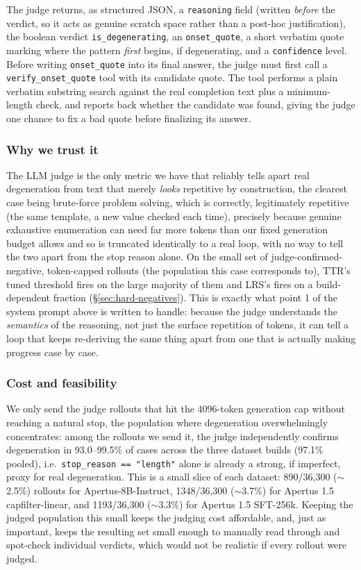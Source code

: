 \documentclass{article}
\begin{document}
The judge returns, as structured JSON, a \texttt{reasoning} field (written
\emph{before} the verdict, so it acts as genuine scratch space rather than a
post-hoc justification), the boolean verdict \texttt{is\_degenerating}, an
\texttt{onset\_quote}, a short verbatim quote marking where the pattern
\emph{first} begins, if degenerating, and a \texttt{confidence} level.
Before writing \texttt{onset\_quote} into its final answer, the judge must first call a \texttt{verify\_onset\_quote}
tool with its candidate quote. The tool performs a plain verbatim substring search against the real completion text
plus a minimum-length check, and reports back whether the candidate was
found, giving the judge one chance to fix a bad quote before finalizing its
answer.

\subsubsection{Why we trust it}

The LLM judge is the only metric we have that reliably tells apart real
degeneration from text that merely \emph{looks} repetitive by construction,
the clearest case being brute-force problem solving, which is correctly,
legitimately repetitive (the same template, a new value checked each time),
precisely because genuine exhaustive enumeration can need far more tokens
than our fixed generation budget allows and so is truncated identically to
a real loop, with no way to tell the two apart from the stop reason alone.
On the small set of judge-confirmed-negative, token-capped rollouts (the
population this case corresponds to), TTR's tuned threshold fires on the
large majority of them and LRS's fires on a build-dependent fraction
(\S\ref{sec:hard-negatives}). This is exactly what point 1 of the system prompt
above is written to handle: because the judge understands the
\emph{semantics} of the reasoning, not just the surface repetition of
tokens, it can tell a loop that keeps re-deriving the same thing apart from
one that is actually making progress case by case.

\subsubsection{Cost and feasibility}

We only send the judge rollouts that hit the $4096$-token generation cap
without reaching a natural stop, the population where degeneration
overwhelmingly concentrates: among the rollouts we send it, the judge
independently confirms degeneration in 93.0--99.5\% of cases across the
three dataset builds (97.1\% pooled), i.e.\ \texttt{stop\_reason ==
"length"} alone is already a strong, if imperfect, proxy for real
degeneration. This is a small slice of each dataset: 890/36{,}300
($\sim$2.5\%) rollouts for Apertus-8B-Instruct, 1348/36{,}300 ($\sim$3.7\%) for Apertus 1.5
capfilter-linear, and 1193/36{,}300 ($\sim$3.3\%) for Apertus 1.5 SFT-256k.
Keeping the judged population this small keeps the judging cost
affordable, and, just as important, keeps the resulting set small
enough to manually read through and spot-check individual verdicts, which
would not be realistic if every rollout were judged.
\end{document}
